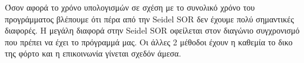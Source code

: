 \documentclass[11pt,a4paper]{article}
\begin{document}
Όσον αφορά το χρόνο υπολογισμών σε σχέση με το συνολικό χρόνο του προγράμματος βλέπουμε ότι πέρα από την Seidel SOR δεν έχουμε πολύ σημαντικές διαφορές. Η μεγάλη
διαφορά στην Seidel SOR οφείλεται στον διαγώνιο συγχρονισμό που πρέπει να έχει το πρόγραμμά μας. Οι άλλες 2 μέθοδοι έχουν η καθεμία το δικο της φόρτο και η 
επικοινωνία γίνεται σχεδόν άμεσα.
\end{document}
